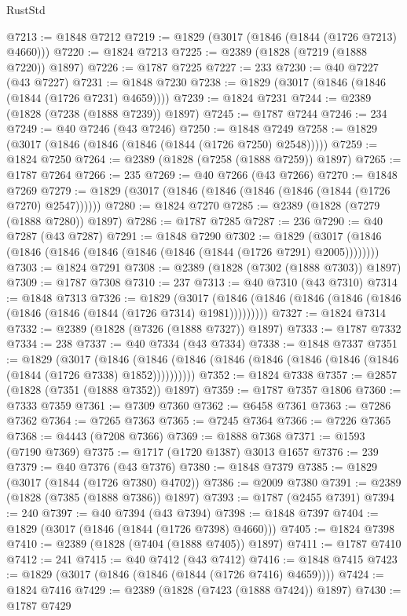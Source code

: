 \begin{lexlean}{RustStd}
\begin{coremodule}
@7213 := @1848 @7212
@7219 := @1829 (@3017 (@1846 (@1844 (@1726 @7213) @4660)))
@7220 := @1824 @7213
@7225 := @2389 (@1828 (@7219 (@1888 @7220)) @1897)
@7226 := @1787 @7225
@7227 := 233
@7230 := @40 @7227 (@43 @7227)
@7231 := @1848 @7230
@7238 := @1829 (@3017 (@1846 (@1846 (@1844 (@1726 @7231) @4659))))
@7239 := @1824 @7231
@7244 := @2389 (@1828 (@7238 (@1888 @7239)) @1897)
@7245 := @1787 @7244
@7246 := 234
@7249 := @40 @7246 (@43 @7246)
@7250 := @1848 @7249
@7258 := @1829 (@3017 (@1846 (@1846 (@1846 (@1844 (@1726 @7250) @2548)))))
@7259 := @1824 @7250
@7264 := @2389 (@1828 (@7258 (@1888 @7259)) @1897)
@7265 := @1787 @7264
@7266 := 235
@7269 := @40 @7266 (@43 @7266)
@7270 := @1848 @7269
@7279 := @1829 (@3017 (@1846 (@1846 (@1846 (@1846 (@1844 (@1726 @7270) @2547))))))
@7280 := @1824 @7270
@7285 := @2389 (@1828 (@7279 (@1888 @7280)) @1897)
@7286 := @1787 @7285
@7287 := 236
@7290 := @40 @7287 (@43 @7287)
@7291 := @1848 @7290
@7302 := @1829 (@3017 (@1846 (@1846 (@1846 (@1846 (@1846 (@1846 (@1844 (@1726 @7291) @2005))))))))
@7303 := @1824 @7291
@7308 := @2389 (@1828 (@7302 (@1888 @7303)) @1897)
@7309 := @1787 @7308
@7310 := 237
@7313 := @40 @7310 (@43 @7310)
@7314 := @1848 @7313
@7326 := @1829
    (@3017 (@1846 (@1846 (@1846 (@1846 (@1846 (@1846 (@1846 (@1844 (@1726 @7314) @1981)))))))))
@7327 := @1824 @7314
@7332 := @2389 (@1828 (@7326 (@1888 @7327)) @1897)
@7333 := @1787 @7332
@7334 := 238
@7337 := @40 @7334 (@43 @7334)
@7338 := @1848 @7337
@7351 := @1829
    (@3017
      (@1846 (@1846 (@1846 (@1846 (@1846 (@1846 (@1846 (@1846 (@1844 (@1726 @7338) @1852))))))))))
@7352 := @1824 @7338
@7357 := @2857 (@1828 (@7351 (@1888 @7352)) @1897)
@7359 := @1787 @7357 @1806
@7360 := @7333 @7359
@7361 := @7309 @7360
@7362 := @6458 @7361
@7363 := @7286 @7362
@7364 := @7265 @7363
@7365 := @7245 @7364
@7366 := @7226 @7365
@7368 := @4443 (@7208 @7366)
@7369 := @1888 @7368
@7371 := @1593 (@7190 @7369)
@7375 := @1717 (@1720 @1387) @3013 @1657
@7376 := 239
@7379 := @40 @7376 (@43 @7376)
@7380 := @1848 @7379
@7385 := @1829 (@3017 (@1844 (@1726 @7380) @4702))
@7386 := @2009 @7380
@7391 := @2389 (@1828 (@7385 (@1888 @7386)) @1897)
@7393 := @1787 (@2455 @7391)
@7394 := 240
@7397 := @40 @7394 (@43 @7394)
@7398 := @1848 @7397
@7404 := @1829 (@3017 (@1846 (@1844 (@1726 @7398) @4660)))
@7405 := @1824 @7398
@7410 := @2389 (@1828 (@7404 (@1888 @7405)) @1897)
@7411 := @1787 @7410
@7412 := 241
@7415 := @40 @7412 (@43 @7412)
@7416 := @1848 @7415
@7423 := @1829 (@3017 (@1846 (@1846 (@1844 (@1726 @7416) @4659))))
@7424 := @1824 @7416
@7429 := @2389 (@1828 (@7423 (@1888 @7424)) @1897)
@7430 := @1787 @7429

\end{coremodule}
\end{lexlean}
